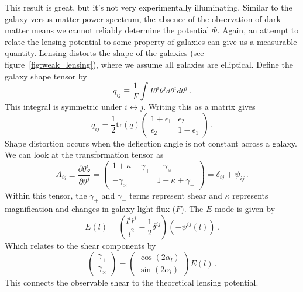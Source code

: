This result is great, but it's not very experimentally illuminating. Similar to the galaxy versus matter power spectrum, the absence of the observation of dark matter means we cannot reliably determine the potential $\Phi$. Again, an attempt to relate the lensing potential to some property of galaxies can give us a measurable quantity. Lensing distorts the shape of the galaxies (see figure~\ref{fig:weak_lensing}), where we assume all galaxies are elliptical. Define the galaxy shape tensor by
\begin{equation}
	q_{ij} \equiv \frac{1}{F}\int I\theta^i\theta^j d\theta^i d\theta^j\,.
\end{equation}
This integral is symmetric under $i \leftrightarrow j$. Writing this as a matrix gives
\begin{equation}
	q_{ij} = \frac{1}{2} \text{tr}(q) \left( 
	\begin{array}{cc}
	1+\epsilon_1 & \epsilon_2 \\
	\epsilon_2 & 1-\epsilon_1
	\end{array}
	\right)\,.
\end{equation}
Shape distortion occurs when the deflection angle is not constant across a galaxy. We can look at the transformation tensor as
\begin{equation}
	A_{ij} \equiv \frac{\partial \theta^i_S}{\partial\theta^j} = \left( 
	\begin{array}{cc}
	1+\kappa - \gamma_+ & -\gamma_\times \\
	-\gamma_\times & 1+\kappa+\gamma_+
	\end{array}
	\right) = \delta_{ij}+\psi_{ij}\,.
\end{equation}
Within this tensor, the $\gamma_+$ and $\gamma_-$ terms represent shear and $\kappa$ represents magnification and changes in galaxy light flux ($F$). The $E$-mode is given by
\begin{equation}
	E(l) = \left( \frac{l^il^j}{l^2} - \frac{1}{2}\delta^{ij} \right)(-\psi^{ij}(l))\,.
\end{equation}
Which relates to the shear components by
\begin{equation}
	\left(
	\begin{array}{c}
	\gamma_+ \\
	\gamma_\times
	\end{array}
	\right)
	=
	\left(
	\begin{array}{c}
	\cos(2\alpha_l) \\
	\sin(2\alpha_l)
	\end{array}
	\right)
	E(l)\,.
\end{equation}
This connects the observable shear to the theoretical lensing potential.
